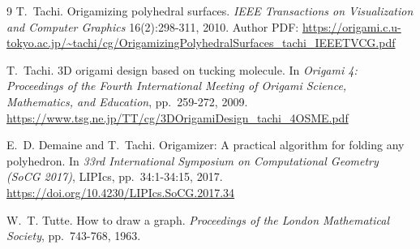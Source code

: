 \documentclass[11pt]{article}
\theoremstyle{definition}
\begin{document}
\begin{thebibliography}{9}
T.~Tachi. Origamizing polyhedral surfaces. \emph{IEEE Transactions on
Visualization and Computer Graphics} 16(2):298-311, 2010. Author PDF:
\url{https://origami.c.u-tokyo.ac.jp/~tachi/cg/OrigamizingPolyhedralSurfaces_tachi_IEEETVCG.pdf}

T.~Tachi. 3D origami design based on tucking molecule. In \emph{Origami 4:
Proceedings of the Fourth International Meeting of Origami Science, Mathematics,
and Education}, pp.~259-272, 2009.
\url{https://www.tsg.ne.jp/TT/cg/3DOrigamiDesign_tachi_4OSME.pdf}

E.~D. Demaine and T.~Tachi. Origamizer: A practical algorithm for folding any
polyhedron. In \emph{33rd International Symposium on Computational Geometry
(SoCG 2017)}, LIPIcs, pp.~34:1-34:15, 2017.
\url{https://doi.org/10.4230/LIPIcs.SoCG.2017.34}

W.~T. Tutte. How to draw a graph. \emph{Proceedings of the London Mathematical
Society}, pp.~743-768, 1963.
\end{thebibliography}
\end{document}
